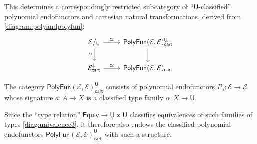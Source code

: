 \documentclass[12pt,reqno]{amsart}
\newcommand{\ednote}[1]{[\textit{\color{red}{#1}}]} %
\newcommand{\EE}{\ensuremath{\mathcal{E}}}
\renewcommand{\to}{\ensuremath{\rightarrow}}
\renewcommand{\t}{\ensuremath{\mathsf{u}}}
\newcommand{\T}{\ensuremath{\mathsf{U}}}
\theoremstyle{remark}
\theoremstyle{definition}
\begin{document}
%


This determines a correspondingly restricted subcategory of ``$\T$-classified'' polynomial endofunctors and cartesian natural transformations, derived from \eqref{diagram:polyandpolyfun}:
\begin{equation}\label{diagram:polyandpolyfun2}
\begin{tikzcd}
\EE/_{\T} \ar[d,swap,"U"] \ar[r,"{\simeq}"] & \mathsf{PolyFun}(\EE, \EE)_{\mathsf{cart}}^\T  \ar[d] \\
\EE^{\downarrow}_{\mathsf{cart}} \ar[r,"{\simeq}"] & \mathsf{PolyFun}(\EE, \EE)_{\mathsf{cart}}
\end{tikzcd}
\end{equation}

The category $\mathsf{PolyFun}(\EE, \EE)_{\mathsf{cart}}^\T$ consists of polynomial endofunctors $P_a : \EE\to \EE$ whose signature $a: A \to X$ is a classified type family $\alpha : X \to \T$.



Since the ``type relation'' $\mathsf{Equiv} \to \T\times \T$ classifies equivalences of such families of types \eqref{diag:univalence3}, it therefore also endows %
the classified polynomial endofunctors $\mathsf{PolyFun}(\EE, \EE)_{\mathsf{cart}}^\T$ with such a structure. 
\end{document}

